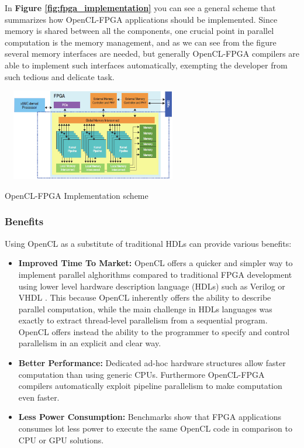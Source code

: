 In \textbf{Figure \ref{fig:fpga_implementation}} you can see a general scheme that summarizes how OpenCL-FPGA applications should be implemented. Since memory is shared between all the components, one crucial point in parallel computation is the memory management, and as we can see from the figure several memory interfaces are needed, but generally OpenCL-FPGA compilers are able to implement such interfaces automatically, exempting the developer from such tedious and delicate task.

\begin{figurehere}
 \centering
 \includegraphics[width=8cm, height=4cm]{./eps/FPGA3.eps}
 \caption{OpenCL-FPGA Implementation scheme}
 \label{fig:fpga_implementation}
\end{figurehere}

\subsubsection{Benefits}

Using OpenCL as a substitute of traditional HDLs can provide various benefits:

\begin{itemize}
	\item \textbf{Improved Time To Market:} OpenCL offers a quicker and simpler way to implement parallel alghorithms  compared to traditional FPGA development using lower level hardware description language (HDLs) such as Verilog or VHDL \cite {altera:FPGA}.  This because OpenCL inherently offers the ability to describe parallel computation, while the main challenge in HDLs languages was exactly to extract thread-level parallelism from a sequential program. OpenCL offers instead the ability to the programmer to specify and control parallelism in an explicit and clear way.
	\item \textbf{Better Performance:} Dedicated ad-hoc hardware structures allow faster computation than using generic CPUs. Furthermore OpenCL-FPGA compilers automatically exploit pipeline parallelism to make computation even faster.
	\item \textbf{Less Power Consumption:} Benchmarks show that FPGA applications consumes lot less power to execute the same OpenCL code in comparison to CPU or GPU solutions.
\end{itemize}

